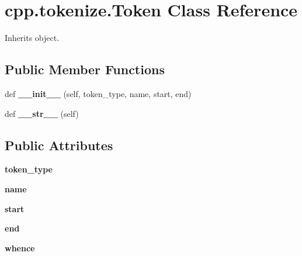 \hypertarget{classcpp_1_1tokenize_1_1Token}{}\section{cpp.\+tokenize.\+Token Class Reference}
\label{classcpp_1_1tokenize_1_1Token}


Inherits object.

\subsection*{Public Member Functions}
\begin{DoxyCompactItemize}
\item 
\mbox{\label{classcpp_1_1tokenize_1_1Token_a7da7659a5a6c61d0f4b8590cf96e19fd}} 
def {\bfseries \+\_\+\+\_\+init\+\_\+\+\_\+} (self, token\+\_\+type, name, start, end)
\item 
\mbox{\label{classcpp_1_1tokenize_1_1Token_a98e024051039637a18601fcbb0232cc2}} 
def {\bfseries \+\_\+\+\_\+str\+\_\+\+\_\+} (self)
\end{DoxyCompactItemize}
\subsection*{Public Attributes}
\begin{DoxyCompactItemize}
\item 
\mbox{\label{classcpp_1_1tokenize_1_1Token_a60c6e5120f3947885f10788ceb69a660}} 
{\bfseries token\+\_\+type}
\item 
\mbox{\label{classcpp_1_1tokenize_1_1Token_a90859dd16bde71bc38f717f5119e63b9}} 
{\bfseries name}
\item 
\mbox{\label{classcpp_1_1tokenize_1_1Token_a8ec48e348ff29901857cb21553da464b}} 
{\bfseries start}
\item 
\mbox{\label{classcpp_1_1tokenize_1_1Token_a9935738c382352eca19834c2533715db}} 
{\bfseries end}
\item 
\mbox{\label{classcpp_1_1tokenize_1_1Token_a9d3a8011707ede6be85987d74f88848d}} 
{\bfseries whence}
\end{DoxyCompactItemize}


